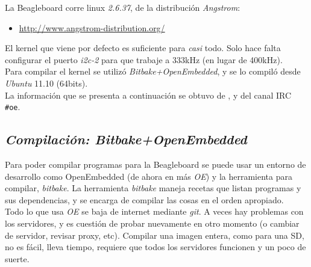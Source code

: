\documentclass[main]{subfiles}
\begin{document}
La Beagleboard corre linux \textit{2.6.37}, de la distribución \textit{Angstrom}:
\begin{itemize}
\item \url{http://www.angstrom-distribution.org/}
\end{itemize}
El kernel que viene por defecto es suficiente para \textit{casi} todo. Solo hace falta configurar el puerto \textit{i2c-2} para que trabaje a 333kHz (en lugar de 400kHz).\\

Para compilar el kernel se utilizó \textit{Bitbake+OpenEmbedded}, y se lo compiló desde \textit{Ubuntu} 11.10 (64bits).\\

La información que se presenta a continuación se obtuvo de \cite{bib:oe-capture-changes}, \cite{bib:oe-angstrom-kernel-workflow} y del canal IRC \verb+#oe+.

\subsection{\textit{Compilación: Bitbake+OpenEmbedded}}
\label{sec:codigo:cross-compiling-bitbake-oe}

Para poder compilar programas para la Beagleboard se puede usar un entorno de desarrollo como OpenEmbedded (de ahora en más \textit{OE}) y la herramienta para compilar, \textit{bitbake}. La herramienta \textit{bitbake} maneja recetas que listan programas y sus dependencias, y se encarga de compilar las cosas en el orden apropiado.\\

Todo lo que usa \textit{OE} se baja de internet mediante \textit{git}. A veces hay problemas con los servidores, y es cuestión de probar nuevamente en otro momento (o cambiar de servidor, revisar proxy, etc). Compilar una imagen entera, como para una SD, no es fácil, lleva tiempo, requiere que todos los servidores funcionen y un poco de suerte.\\
\end{document}
